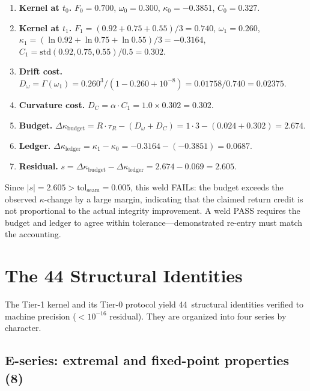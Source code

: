 \documentclass[
  aps,
  prd,
  twocolumn,
  superscriptaddress,
  nofootinbib,
  floatfix
]{revtex4-2}
\newcommand{\tR}{\tau_{\!R}}
\newcommand{\Gam}{\Gamma}
\newcommand{\tolseam}{\mathrm{tol}_{\mathrm{seam}}}
\newcommand{\regime}[1]{\textrm{\scshape#1}}
\begin{document}
\begin{enumerate}[leftmargin=*,label=\textbf{\arabic*.}]
\item \textbf{Kernel at $t_0$.}
  $F_0 = 0.700$, $\omega_0 = 0.300$, $\kappa_0 = -0.3851$,
  $C_0 = 0.327$.
\item \textbf{Kernel at $t_1$.}
  $F_1 = (0.92 + 0.75 + 0.55)/3 = 0.740$,
  $\omega_1 = 0.260$,
  $\kappa_1 = (\ln 0.92 + \ln 0.75 + \ln 0.55)/3 = -0.3164$,
  $C_1 = \mathrm{std}(0.92, 0.75, 0.55)/0.5 = 0.302$.
\item \textbf{Drift cost.}
  $D_\omega = \Gam(\omega_1) = 0.260^3/(1 - 0.260 + 10^{-8})
  = 0.01758/0.740 = 0.02375$.
\item \textbf{Curvature cost.}
  $D_C = \alpha \cdot C_1 = 1.0 \times 0.302 = 0.302$.
\item \textbf{Budget.}
  $\Delta\kappa_{\mathrm{budget}} = R \cdot \tR - (D_\omega + D_C)
  = 1 \cdot 3 - (0.024 + 0.302) = 2.674$.
\item \textbf{Ledger.}
  $\Delta\kappa_{\mathrm{ledger}} = \kappa_1 - \kappa_0
  = -0.3164 - (-0.3851) = 0.0687$.
\item \textbf{Residual.}
  $s = \Delta\kappa_{\mathrm{budget}} - \Delta\kappa_{\mathrm{ledger}}
  = 2.674 - 0.069 = 2.605$.
\end{enumerate}

\noindent Since $|s| = 2.605 > \tolseam = 0.005$, this weld
\regime{FAIL}s: the budget exceeds the observed
$\kappa$-change by a large margin, indicating that the claimed
return credit is not proportional to the actual integrity
improvement.  A weld \regime{PASS} requires the budget and
ledger to agree within tolerance---demonstrated re-entry must
match the accounting.


\section{The 44 Structural Identities}\label{sec:identities}

The Tier-1 kernel and its Tier-0 protocol yield 44~structural
identities verified to machine precision
($< 10^{-16}$ residual).
They are organized into four series by character.

\subsection{E-series: extremal and fixed-point properties (8)}
\end{document}
